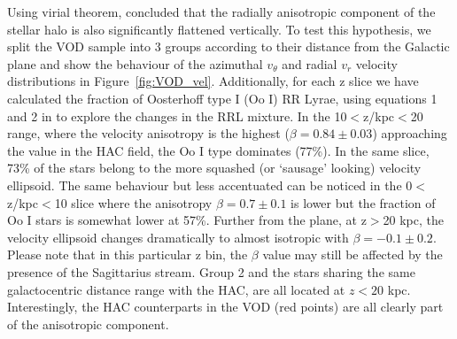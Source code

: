\documentclass[fleqn,usenatbib]{mnras}
\begin{document}
Using virial theorem, \citet{actionhalo} concluded that the radially
anisotropic component of the stellar halo is also significantly
flattened vertically. To test this hypothesis, we split the VOD sample
into 3 groups according to their distance from the Galactic plane and
show the behaviour of the azimuthal $v_{\theta}$ and radial $v_{r}$
velocity distributions in Figure~\ref{fig:VOD_vel}. Additionally, for
each z slice we have calculated the fraction of Oosterhoff type I (Oo
I) RR Lyrae, using equations 1 and 2 in \citet{Be2018} to explore the
changes in the RRL mixture. In the 10$<$z/kpc$<$20 range, where the
velocity anisotropy is the highest ($\beta = 0.84 \pm 0.03$)
approaching the value in the HAC field, the Oo I type dominates
(77\%). In the same slice, 73\% of the stars belong to the more
squashed (or `sausage' looking) velocity ellipsoid. The same behaviour
but less accentuated can be noticed in the 0$<$z/kpc$<$10 slice where
the anisotropy $\beta = 0.7 \pm 0.1$ is lower but the fraction of Oo I
stars is somewhat lower at 57\%. Further from the plane, at z$>$20
kpc, the velocity ellipsoid changes dramatically to almost isotropic
with $\beta = -0.1 \pm 0.2$. Please note that in this particular z
bin, the $\beta$ value may still be affected by the presence of the
Sagittarius stream. Group 2 and the stars sharing the same
galactocentric distance range with the HAC, are all located at $z<20$
kpc. Interestingly, the HAC counterparts in the VOD (red points) are
all clearly part of the anisotropic component.

% 
\end{document}
